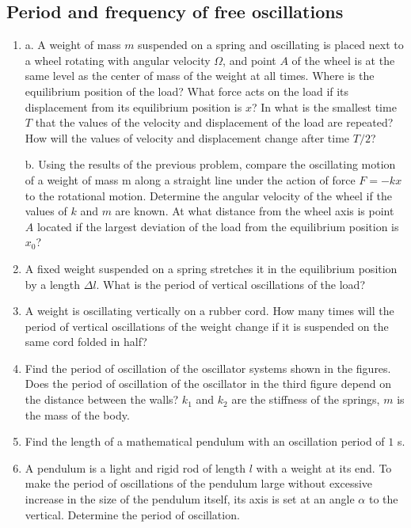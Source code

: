\documentclass{article}
\begin{document}
\subsection{Period and frequency of free oscillations}

\begin{enumerate}[label=3.2.\arabic*]
\item a. A weight of mass $m$ suspended on a spring and oscillating is placed next to a wheel rotating with angular velocity $\Omega$, and point $A$ of the wheel is at the same level as the center of mass of the weight at all times. Where is the equilibrium position of the load? What force acts on the load if its displacement from its equilibrium position is $x$? In what is the smallest time $T$ that the values of the velocity and displacement of the load are repeated? How will the values of velocity and displacement change after time $T/2$? 

b. Using the results of the previous problem, compare the oscillating motion of a weight of mass m along a straight line under the action of force $F = -k x$ to the rotational motion. Determine the angular velocity of the wheel if the values of $k$ and $m$ are known. At what distance from the wheel axis is point $A$ located if the largest deviation of the load from the equilibrium position is $x_0$?

\item A fixed weight suspended on a spring stretches it in the equilibrium position by a length $\Delta l$. What is the period of vertical oscillations of the load?

\item A weight is oscillating vertically on a rubber cord. How many times will the period of vertical oscillations of the weight change if it is suspended on the same cord folded in half?

\item Find the period of oscillation of the oscillator systems shown in the figures. Does the period of oscillation of the oscillator in the third figure depend on the distance between the walls? $k_1$ and $k_2$ are the stiffness of the springs, $m$ is the mass of the body.

\item Find the length of a mathematical pendulum with an oscillation period of $1$ s.

\item A pendulum is a light and rigid rod of length $l$ with a weight at its end. To make the period of oscillations of the pendulum large without excessive increase in the size of the pendulum itself, its axis is set at an angle $\alpha$ to the vertical. Determine the period of oscillation.


\end{enumerate}
\end{document}
